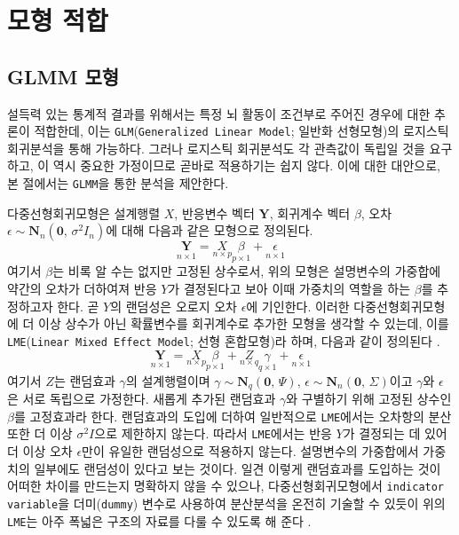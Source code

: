 \documentclass[11pt,onecolumn,twoside,a4size]{gsag3jnl}
\begin{document}
\section{모형 적합}
\subsection{GLMM 모형}
설득력 있는 통계적 결과를 위해서는 특정 뇌 활동이 조건부로 주어진 경우에 대한 추론이 적합한데, 이는 \texttt{GLM}(\texttt{Generalized Linear Model}; 일반화 선형모형)의 로지스틱 회귀분석을 통해 가능하다. 그러나 로지스틱 회귀분석도 각 관측값이 독립일 것을 요구하고, 이 역시 중요한 가정이므로 곧바로 적용하기는 쉽지 않다. 이에 대한 대안으로, 본 절에서는 \texttt{GLMM}을 통한 분석을 제안한다.

다중선형회귀모형은 설계행렬 $X$, 반응변수 벡터 $\mathbf{Y}$, 회귀계수 벡터 $\beta$, 오차 $\epsilon\sim\mathbf{N}_n(\mathbf{0},\,\sigma^2I_n)$에 대해 다음과 같은 모형으로 정의된다.
\begin{equation*}
  \underset{n\times1}{\mathbf{Y}}=\underset{n\times p}{X}\underset{p\times1}{\beta}+\underset{n\times1}{\epsilon}
\end{equation*}
여기서 $\beta$는 비록 알 수는 없지만 고정된 상수로서, 위의 모형은 설명변수의 가중합에 약간의 오차가 더하여져 반응 $Y$가 결정된다고 보아 이때 가중치의 역할을 하는 $\beta$를 추정하고자 한다. 곧 $Y$의 랜덤성은 오로지 오차 $\epsilon$에 기인한다. 이러한 다중선형회귀모형에 더 이상 상수가 아닌 확률변수를 회귀계수로 추가한 모형을 생각할 수 있는데, 이를 \texttt{LME}(\texttt{Linear Mixed Effect Model}; 선형 혼합모형)라 하며, 다음과 같이 정의된다 \texttt{\citep{demidenko2013mixed}}.
\begin{equation*}
  \underset{n\times1}{\mathbf{Y}}=\underset{n\times p}{X}\underset{p\times1}{\beta}+\underset{n\times q}{Z}\underset{q\times1}{\gamma}+\underset{n\times1}{\epsilon}
\end{equation*}
여기서 $Z$는 랜덤효과 $\gamma$의 설계행렬이며 $\gamma\sim\mathbf{N}_q(\mathbf{0},\,\Psi),\,\epsilon\sim\mathbf{N}_n(\mathbf{0},\,\Sigma)$이고 $\gamma$와 $\epsilon$은 서로 독립으로 가정한다. 새롭게 추가된 랜덤효과 $\gamma$와 구별하기 위해 고정된 상수인 $\beta$를 고정효과라 한다. 랜덤효과의 도입에 더하여 일반적으로 \texttt{LME}에서는 오차항의 분산 또한 더 이상 $\sigma^2I$으로 제한하지 않는다. 따라서 \texttt{LME}에서는 반응 $Y$가 결정되는 데 있어 더 이상 오차 $\epsilon$만이 유일한 랜덤성으로 적용하지 않는다. 설명변수의 가중합에서 가중치의 일부에도 랜덤성이 있다고 보는 것이다. 일견 이렇게 랜덤효과를 도입하는 것이 어떠한 차이를 만드는지 명확하지 않을 수 있으나, 다중선형회귀모형에서 \texttt{indicator variable}을 더미(\texttt{dummy}) 변수로 사용하여 분산분석을 온전히 기술할 수 있듯이 위의 \texttt{LME}는 아주 폭넓은 구조의 자료를 다룰 수 있도록 해 준다 \texttt{\citep{searle2001generalized}}.
\end{document}
